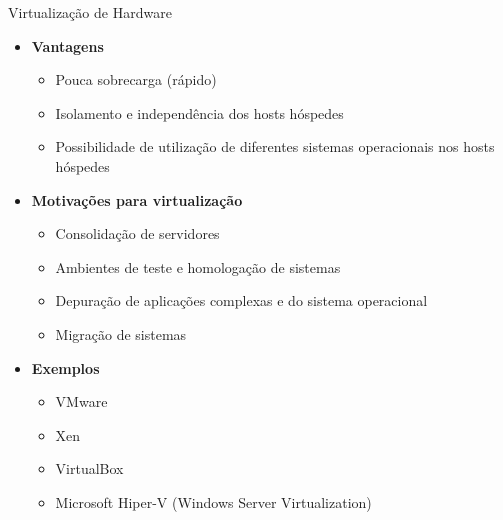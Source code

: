 \documentclass{beamer}
\begin{document}
\begin{frame}{Virtualização de Hardware}
    \begin{itemize}
        \item \textbf{Vantagens}
        \begin{itemize}
            \item Pouca sobrecarga (rápido)
            \item Isolamento e independência dos hosts hóspedes
            \item Possibilidade de utilização de diferentes sistemas operacionais nos hosts hóspedes
        \end{itemize}
        
        \item \textbf{Motivações para virtualização}
        \begin{itemize}
            \item Consolidação de servidores
            \item Ambientes de teste e homologação de sistemas
            \item Depuração de aplicações complexas e do sistema operacional
            \item Migração de sistemas
        \end{itemize}
        
        \item \textbf{Exemplos}
        \begin{itemize}
            \item VMware
            \item Xen
            \item VirtualBox
            \item Microsoft Hiper-V (Windows Server Virtualization)
        \end{itemize}
    \end{itemize}
\end{frame}
\end{document}
